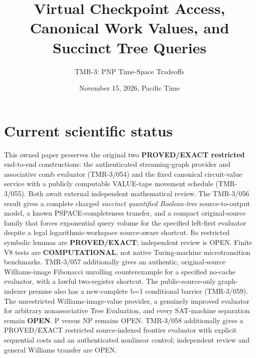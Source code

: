 \documentclass[11pt]{article}
\title{Virtual Checkpoint Access, Canonical Work Values, and Succinct Tree Queries}
\author{TMR-3: PNP Time-Space Tradeoffs}
\date{November 15, 2026, Pacific Time}
\begin{document}
\maketitle

\section{Current scientific status}
This owned paper preserves the original two \textbf{PROVED/EXACT
restricted} end-to-end constructions: the authenticated
streaming-graph provider and associative comb evaluator (TMR-3/054)
and the fixed canonical circuit-value service with a publicly
computable VALUE-tape movement schedule (TMR-3/055).
Both await external independent mathematical review.
The TMR-3/056 result gives a complete charged
\emph{succinct quantified Boolean-tree} source-to-output model,
a known PSPACE-completeness transfer, and a compact original-source
family that forces exponential query volume for the specified
left-first evaluator despite a legal logarithmic-workspace
source-aware shortcut. Its restricted symbolic lemmas are
\textbf{PROVED/EXACT}; independent review is OPEN.
Finite V8 tests are \textbf{COMPUTATIONAL}, not native Turing-machine
microtransition benchmarks. TMR-3/057 additionally gives an authentic, original-source Williams-image Fibonacci unrolling counterexample for a specified no-cache evaluator, with a lawful two-register shortcut. The public-source-only graph-indexer premise also has a new\nP-complete b=1 conditional barrier (TMR-3/059). The unrestricted Williams-image\nwork-value provider, a genuinely improved evaluator for arbitrary
nonassociative Tree Evaluation, and every SAT-machine separation remain
\textbf{OPEN}. P versus NP remains OPEN. TMR-3/058 additionally gives a PROVED/EXACT restricted source-indexed frontier evaluator with explicit sequential costs and an authenticated nonlinear control; independent review and general Williams transfer are OPEN.
\end{document}
